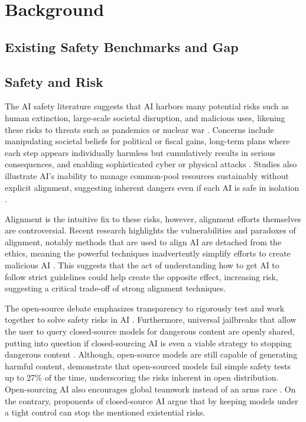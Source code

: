 \section{Background}

\subsection{Existing Safety Benchmarks and Gap}


\subsection{Safety and Risk}

The AI safety literature suggests that AI harbors many potential risks such as human extinction, large-scale societal disruption, and malicious uses, likening these risks to threats such as pandemics or nuclear war \citep{center_for_ai_safety_statement_2025, turchin_classification_2020}. Concerns include manipulating societal beliefs for political or fiscal gains, long-term plans where each step appears individually harmless but cumulatively results in serious consequences, and enabling sophisticated cyber or physical attacks \citep{shevlane_model_2023, ferrara_genai_2024}. Studies also illustrate AI's inability to manage common-pool resources sustainably without explicit alignment, suggesting inherent dangers even if each AI is safe in isolation \citep{perolat_multi_agent_2017, phelps_machine_2024}.

Alignment is the intuitive fix to these risks, however, alignment efforts themselves are controversial. Recent research highlights the vulnerabilities and paradoxes of alignment, notably methods that are used to align AI are detached from the ethics, meaning the powerful techniques inadvertently simplify efforts to create malicious AI \citep{zhou_emulated_2024, west_ai_2024}. This suggests that the act of understanding how to get AI to follow strict guidelines could help create the opposite effect, increasing risk, suggesting a critical trade-off of strong alignment techniques.

The open-source debate emphasizes transparency to rigorously test and work together to solve safety risks in AI \citep{horowitz_ai_2021}. Furthermore, universal jailbreaks that allow the user to query closed-source models for dangerous content are openly shared, putting into question if closed-sourcing AI is even a viable strategy to stopping dangerous content \citep{elderplinius2025l1b3rt4s, zou_universal_2023}. Although, open-source models are still capable of generating harmful content, \cite{vidgen_simplesafetytests_2024} demonstrate that open-sourced models fail simple safety tests up to 27\% of the time, underscoring the risks inherent in open distribution. Open-sourcing AI also encourages global teamwork instead of an arms race \citep{horowitz_ai_2021}. On the contrary, proponents of closed-source AI argue that by keeping models under a tight control can stop the mentioned existential risks.

